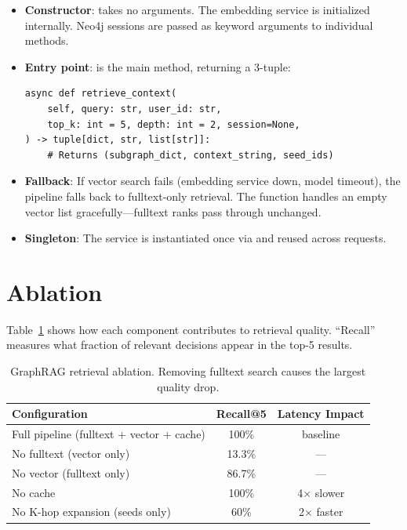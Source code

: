 \begin{itemize}
    \item \textbf{Constructor}:  takes no arguments.
          The embedding service is initialized internally.  Neo4j sessions
          are passed as keyword arguments to individual methods.

    \item \textbf{Entry point}:  is the main
          method, returning a 3-tuple:
          \begin{lstlisting}[style=python, numbers=none]
async def retrieve_context(
    self, query: str, user_id: str,
    top_k: int = 5, depth: int = 2, session=None,
) -> tuple[dict, str, list[str]]:
    # Returns (subgraph_dict, context_string, seed_ids)
          \end{lstlisting}

    \item \textbf{Fallback}: If vector search fails (embedding service
          down, model timeout), the pipeline falls back to
          fulltext-only retrieval.  The  function handles
          an empty vector list gracefully---fulltext ranks pass through
          unchanged.

    \item \textbf{Singleton}: The service is instantiated once via
           and reused across requests.
\end{itemize}


\section{Ablation}
\label{sec:graphrag-ablation}

Table~\ref{tab:graphrag-ablation} shows how each component contributes
to retrieval quality.  ``Recall'' measures what fraction of relevant
decisions appear in the top-5 results.

\begin{table}[ht]
\centering
\caption{GraphRAG retrieval ablation.  Removing fulltext search causes
the largest quality drop.}
\label{tab:graphrag-ablation}
\begin{tabular}{lcc}
\toprule
\textbf{Configuration} & \textbf{Recall@5} & \textbf{Latency Impact} \\
\midrule
Full pipeline (fulltext + vector + cache) & 100\% & baseline \\
No fulltext (vector only)                 & 13.3\% & --- \\
No vector (fulltext only)                 & 86.7\% & --- \\
No cache                                  & 100\% & 4$\times$ slower \\
No K-hop expansion (seeds only)           & 60\% & 2$\times$ faster \\
\bottomrule
\end{tabular}
\end{table}


